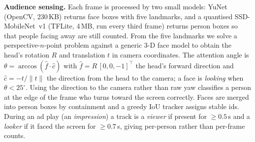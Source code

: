 \documentclass[10pt,a4paper]{article}
\begin{document}
\begin{center}
\vspace{2pt}
\label{fig:arch}
\end{center}
\vspace{-6pt}

\textbf{Audience sensing.} Each frame is processed by two small models: YuNet (OpenCV, 230\,KB) returns face
boxes with five landmarks, and a quantised SSD-MobileNet~v1 (TFLite, 4\,MB, run every third frame) returns
person boxes so that people facing away are still counted. From the five landmarks we solve a
perspective-$n$-point problem against a generic 3-D face model to obtain the head's rotation $R$ and
translation $t$ in camera coordinates. The attention angle is $\theta=\arccos(\hat f\cdot\hat c)$ with
$\hat f=R\,[0,0,-1]^{\top}$ the head's forward direction and $\hat c=-t/\lVert t\rVert$ the direction from the
head to the camera; a face is \emph{looking} when $\theta<25^{\circ}$. Using the direction to the camera rather
than raw yaw classifies a person at the edge of the frame who turns toward the screen correctly. Faces are
merged into person boxes by containment and a greedy IoU tracker assigns stable ids. During an ad play (an
\emph{impression}) a track is a \emph{viewer} if present for $\geq 0.5$\,s and a \emph{looker} if it faced the
screen for $\geq 0.7$\,s, giving per-person rather than per-frame counts.
\end{document}
